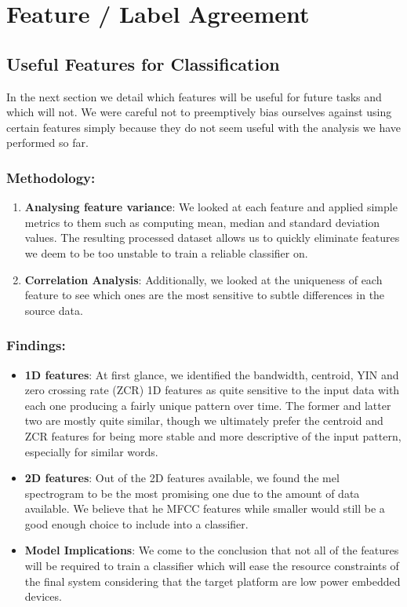 \section{Feature / Label Agreement}

\subsection{Useful Features for Classification}
In the next section we detail which features will be useful for future tasks and which will not. We were careful not to preemptively bias ourselves against using certain features simply because they do not seem useful with the analysis we have performed so far.
\subsubsection{Methodology:}

\begin{enumerate}
    \item \textbf{Analysing feature variance}: We looked at each feature and applied simple metrics to them such as computing mean, median and standard deviation values. The resulting processed dataset allows us to quickly eliminate features we deem to be too unstable to train a reliable classifier on.
    \item \textbf{Correlation Analysis}: Additionally, we looked at the uniqueness of each feature to see which ones are the most sensitive to subtle differences in the source data.
\end{enumerate}

\subsubsection{Findings:}

\begin{itemize}
    \item \textbf{1D features}: At first glance, we identified the bandwidth, centroid, YIN and zero crossing rate (ZCR) 1D features as quite sensitive to the input data with each one producing a fairly unique pattern over time. The former and latter two are mostly quite similar, though we ultimately prefer the centroid and ZCR features for being more stable and more descriptive of the input pattern, especially for similar words.
    \item \textbf{2D features}: Out of the 2D features available, we found the mel spectrogram to be the most promising one due to the amount of data available. We believe that he MFCC features while smaller would still be a good enough choice to include into a classifier.
    \item \textbf{Model Implications}: We come to the conclusion that not all of the features will be required to train a classifier which will ease the resource constraints of the final system considering that the target platform are low power embedded devices.
\end{itemize}

